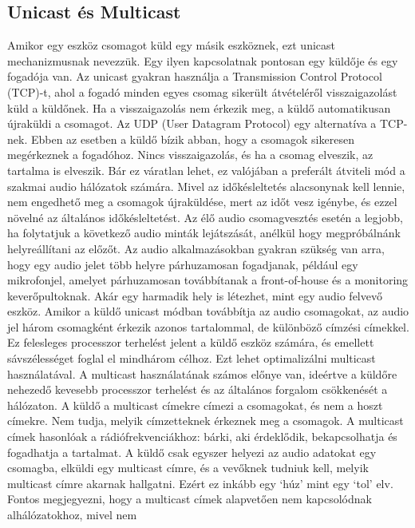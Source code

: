 \subsection{Unicast és Multicast} %
Amikor egy eszköz csomagot küld egy másik eszköznek, ezt unicast mechanizmusnak
nevezzük. Egy ilyen kapcsolatnak pontosan egy küldője és egy fogadója van. Az
unicast gyakran használja a Transmission Control Protocol (TCP)-t, ahol a fogadó
minden egyes csomag sikerült átvételéről visszaigazolást küld a küldőnek. Ha a
visszaigazolás nem érkezik meg, a küldő automatikusan újraküldi a csomagot. Az
UDP (User Datagram Protocol) egy alternatíva a TCP-nek. Ebben az esetben a küldő
bízik abban, hogy a csomagok sikeresen megérkeznek a fogadóhoz. Nincs
visszaigazolás, és ha a csomag elveszik, az tartalma is elveszik. Bár ez
váratlan lehet, ez valójában a preferált átviteli mód a szakmai audio hálózatok
számára. Mivel az időkésleltetés alacsonynak kell lennie, nem engedhető meg a
csomagok újraküldése, mert az időt vesz igénybe, és ezzel növelné az általános
időkésleltetést. Az élő audio csomagvesztés esetén a legjobb, ha folytatjuk a
következő audio minták lejátszását, anélkül hogy megpróbálnánk helyreállítani az
előzőt. Az audio alkalmazásokban gyakran szükség van arra, hogy egy audio jelet
több helyre párhuzamosan fogadjanak, például egy mikrofonjel, amelyet
párhuzamosan továbbítanak a front-of-house és a monitoring keverőpultoknak. Akár
egy harmadik hely is létezhet, mint egy audio felvevő eszköz. Amikor a küldő
unicast módban továbbítja az audio csomagokat, az audio jel három csomagként
érkezik azonos tartalommal, de különböző címzési címekkel. Ez felesleges
processzor terhelést jelent a küldő eszköz számára, és emellett sávszélességet
foglal el mindhárom célhoz. Ezt lehet optimalizálni multicast használatával. A
multicast használatának számos előnye van, ideértve a küldőre nehezedő kevesebb
processzor terhelést és az általános forgalom csökkenését a hálózaton. A küldő a
multicast címekre címezi a csomagokat, és nem a hoszt címekre. Nem tudja, melyik
címzetteknek érkeznek meg a csomagok. A multicast címek hasonlóak a
rádiófrekvenciákhoz: bárki, aki érdeklődik, bekapcsolhatja és fogadhatja a
tartalmat. A küldő csak egyszer helyezi az audio adatokat egy csomagba, elküldi
egy multicast címre, és a vevőknek tudniuk kell, melyik multicast címre akarnak
hallgatni. Ezért ez inkább egy `húz' mint egy `tol' elv. Fontos megjegyezni,
hogy a multicast címek alapvetően nem kapcsolódnak alhálózatokhoz, mivel nem
